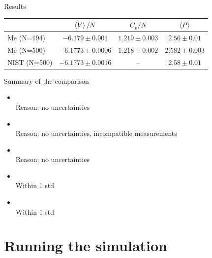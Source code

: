 \documentclass[10pt, compress, protectframetitle, handout]{beamer}
\begin{document}
\begin{frame}[allowframebreaks]{Results}
\begin{itemize}
\begin{itemize}
\begin{table}
\begin{tabular}{lccc}
					\toprule
					 & $\Braket{V}/N$ & $C_v/N$ & $\Braket{P}$ \\
					\midrule
					Me \scriptsize{(N=194)} & $-6.179 \pm 0.001$ & $1.219 \pm 0.003$ & $2.56 \pm 0.01$ \\
					Me \scriptsize{(N=500)} & $-6.1773 \pm 0.0006$ & $1.218 \pm 0.002$ & $2.582 \pm 0.003$ \\
					NIST \scriptsize{(N=500)} & $-6.1773 \pm 0.0016$ & -- & $2.58 \pm 0.01$ \\
					\bottomrule
				\end{tabular}
			\end{table}
		\end{itemize}
	\end{itemize}
	
\end{frame}

\begin{frame}{Summary of the comparison}
	\begin{itemize}
		\item {\color{myred}  \Large\Frowny}\\
		{\footnotesize{\alert{Reason:} no uncertainties}}
		\item {\color{myred}  \Large\Frowny}\\
		{\footnotesize{\alert{Reason:} no uncertainties, incompatible measurements}}
		\item {\color{myred}  \Large\Frowny}\\
		{\footnotesize{\alert{Reason:} no uncertainties}}
		\item {\color{mygreen}  \Large\Smiley}\\
		{\footnotesize{Within 1 std}}
		\item {\color{mygreen}  \Large\Smiley}\\
		{\footnotesize{Within 1 std}}
	\end{itemize}
\end{frame}


\section{Running the simulation}
\end{document}
